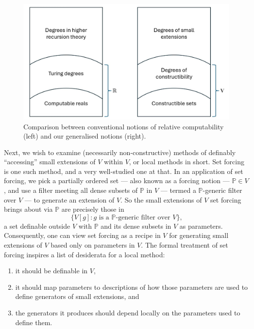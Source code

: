 \documentclass[12pt, twoside]{memoir}
\numberwithin{equation}{section}
\theoremstyle{definition}
\theoremstyle{remark}
\theoremstyle{definition}
\theoremstyle{definition}
\theoremstyle{definition}
\theoremstyle{remark}
\begin{document}
\begin{figure}[!ht]
    \centering
    \includegraphics[width=\textwidth]{analogy.jpg}
    \captionsetup{width=0.8\textwidth, format=hang}
    \caption[Comparison between conventional and generalised notions of relative computability]{Comparison between conventional notions of relative computability (left) and our generalised notions (right).}
    \label{analogy}
\end{figure}

Next, we wish to examine (necessarily non-constructive) methods of definably ``accessing'' small extensions of $V$ within $V$, or local methods in short. Set forcing is one such method, and a very well-studied one at that. In an application of set forcing, we pick a partially ordered set --- also known as a forcing notion --- $\mathbb{P} \in V$, and use a filter meeting all dense subsets of $\mathbb{P}$ in $V$ --- termed a $\mathbb{P}$-generic filter over $V$ --- to generate an extension of $V$. So the small extensions of $V$ set forcing brings about via $\mathbb{P}$ are precisely those in
\begin{equation*}
    \{V[g] : g \text{ is a } \mathbb{P} \text{-generic filter over } V\} \text{,}
\end{equation*}
a set definable outside $V$ with $\mathbb{P}$ and its dense subsets in $V$ as parameters. Consequently, one can view set forcing as a recipe in $V$ for generating small extensions of $V$ based only on parameters in $V$. The formal treatment of set forcing inspires a list of desiderata for a local method:
\begin{enumerate}[leftmargin=40pt, label=(DA\arabic*)]
    \item\label{da1} it should be definable in $V$,
    \item\label{da2} it should map parameters to descriptions of how those parameters are used to define generators of small extensions, and
    \item\label{da3} the generators it produces should depend locally on the parameters used to define them. 
\end{enumerate}
\end{document}
